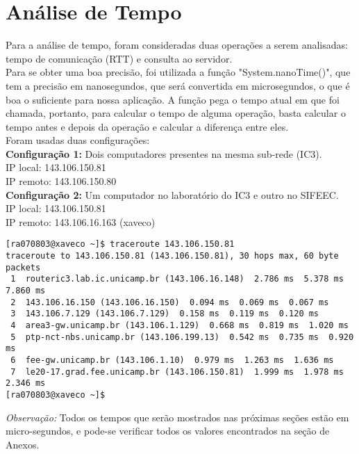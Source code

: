 \documentclass[11pt,twoside]{article}
\begin{document}
\section{Análise de Tempo}
Para a análise de tempo, foram consideradas duas operações a serem analisadas: tempo de comunicação (RTT) e consulta ao servidor.\\
Para se obter uma boa precisão, foi utilizada a função "System.nanoTime()", que tem a precisão em nanosegundos, que será convertida em microsegundos, o que é boa o suficiente para nossa aplicação. A função pega o tempo atual em que foi chamada, portanto, para calcular o tempo de alguma operação, basta calcular o tempo antes e depois da operação e calcular a diferença entre eles.\\
Foram usadas duas configurações:\\
\textbf{Configuração 1: }Dois computadores presentes na mesma sub-rede (IC3).\\
IP local: 143.106.150.81\\
IP remoto: 143.106.150.80\\
\textbf{Configuração 2: }Um computador no laboratório do IC3 e outro no SIFEEC.\\
IP local: 143.106.150.81\\
IP remoto: 143.106.16.163 (xaveco)\\
\begin{verbatim}
[ra070803@xaveco ~]$ traceroute 143.106.150.81
traceroute to 143.106.150.81 (143.106.150.81), 30 hops max, 60 byte packets
 1  routeric3.lab.ic.unicamp.br (143.106.16.148)  2.786 ms  5.378 ms  7.860 ms
 2  143.106.16.150 (143.106.16.150)  0.094 ms  0.069 ms  0.067 ms
 3  143.106.7.129 (143.106.7.129)  0.158 ms  0.119 ms  0.120 ms
 4  area3-gw.unicamp.br (143.106.1.129)  0.668 ms  0.819 ms  1.020 ms
 5  ptp-nct-nbs.unicamp.br (143.106.199.13)  0.542 ms  0.735 ms  0.920 ms
 6  fee-gw.unicamp.br (143.106.1.10)  0.979 ms  1.263 ms  1.636 ms
 7  le20-17.grad.fee.unicamp.br (143.106.150.81)  1.999 ms  1.978 ms  2.346 ms
[ra070803@xaveco ~]$
\end{verbatim}
\textit{Observação: }Todos os tempos que serão mostrados nas próximas seções estão em micro-segundos, e pode-se verificar todos os valores encontrados na seção de Anexos.\\
\end{document}
